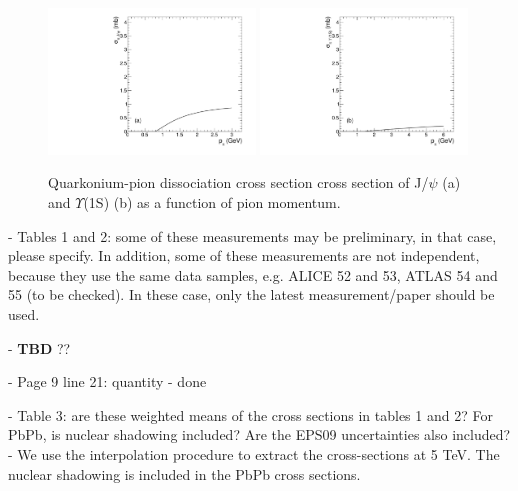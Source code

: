 \documentclass[a4paper,11pt]{article}
\begin{document}
\begin{figure}
\includegraphics[width=0.49\textwidth]{Fig_JPsi_SigmaD_Pion.pdf}
\includegraphics[width=0.49\textwidth]{Fig_Y1S_SigmaD_Pion.pdf}
\caption{Quarkonium-pion dissociation cross section cross section of J/$\psi$ (a) and $\Upsilon$(1S) (b) as a function of
pion momentum.}
\label{fig:SigmaDPi}
\end{figure}

- Tables 1 and 2: some of these measurements may be preliminary, in that case, please specify. In addition, some of these
measurements are not independent, because they use the same data samples, e.g. ALICE 52 and 53, ATLAS 54 and 55 (to be checked).
In these case, only the latest measurement/paper should be used. \newline

- {\color{red} \textbf{TBD} ??}\newline





- Page 9 line 21: quantity \newline
- {\color{blue} done}\newline

- Table 3: are these weighted means of the cross sections in tables 1 and 2? For PbPb, is nuclear shadowing included? Are the EPS09
uncertainties also included? \newline
- {\color{blue} We use the interpolation procedure to extract the cross-sections at 5 TeV. The nuclear shadowing is included in the
PbPb cross sections.}\newline
\end{document}

